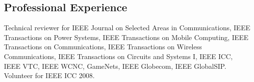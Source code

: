 \documentclass[margin,line]{res}
\begin{document}
\begin{resume}
\section{\sc Professional Experience}
Technical reviewer for IEEE Journal on Selected Areas in Communications, IEEE Transactions on Power Systems, IEEE Transactions on Mobile Computing, IEEE Transactions on Communications, IEEE Transactions on Wireless Communications, IEEE Transactions on Circuits and Systems I, IEEE ICC, IEEE VTC, IEEE WCNC, GameNets, IEEE Globecom, IEEE GlobalSIP.\\
Volunteer for IEEE ICC 2008.\\




\end{resume}
\end{document}
